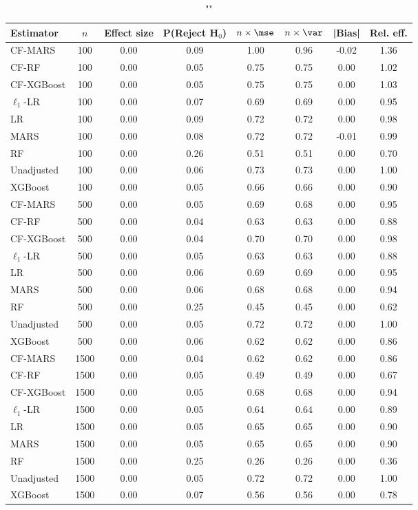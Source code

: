 \begin{table}
\centering
\caption{""}
\begin{tabular}{lccccccc}
\toprule
Estimator & $n$ & Effect size & P(Reject H$_0$) & $n\times\mse$ & $n\times \var$ & |Bias| & Rel. eff.\\ \midrule
CF-MARS & 100 & 0.00 & 0.09 & 1.00 & 0.96 & -0.02 & 1.36 \\ 
CF-RF & 100 & 0.00 & 0.05 & 0.75 & 0.75 &  0.00 & 1.02 \\ 
CF-XGBoost & 100 & 0.00 & 0.05 & 0.75 & 0.75 &  0.00 & 1.03 \\ 
$\ell_1$-LR & 100 & 0.00 & 0.07 & 0.69 & 0.69 &  0.00 & 0.95 \\ 
LR & 100 & 0.00 & 0.09 & 0.72 & 0.72 &  0.00 & 0.98 \\ 
MARS & 100 & 0.00 & 0.08 & 0.72 & 0.72 & -0.01 & 0.99 \\ 
RF & 100 & 0.00 & 0.26 & 0.51 & 0.51 &  0.00 & 0.70 \\ 
Unadjusted & 100 & 0.00 & 0.06 & 0.73 & 0.73 &  0.00 & 1.00 \\ 
XGBoost & 100 & 0.00 & 0.05 & 0.66 & 0.66 &  0.00 & 0.90 \\ \addlinespace 
CF-MARS & 500 & 0.00 & 0.05 & 0.69 & 0.68 &  0.00 & 0.95 \\ 
CF-RF & 500 & 0.00 & 0.04 & 0.63 & 0.63 &  0.00 & 0.88 \\ 
CF-XGBoost & 500 & 0.00 & 0.04 & 0.70 & 0.70 &  0.00 & 0.98 \\ 
$\ell_1$-LR & 500 & 0.00 & 0.05 & 0.63 & 0.63 &  0.00 & 0.88 \\ 
LR & 500 & 0.00 & 0.06 & 0.69 & 0.69 &  0.00 & 0.95 \\ 
MARS & 500 & 0.00 & 0.06 & 0.68 & 0.68 &  0.00 & 0.94 \\ 
RF & 500 & 0.00 & 0.25 & 0.45 & 0.45 &  0.00 & 0.62 \\ 
Unadjusted & 500 & 0.00 & 0.05 & 0.72 & 0.72 &  0.00 & 1.00 \\ 
XGBoost & 500 & 0.00 & 0.06 & 0.62 & 0.62 &  0.00 & 0.86 \\ \addlinespace 
CF-MARS & 1500 & 0.00 & 0.04 & 0.62 & 0.62 &  0.00 & 0.86 \\ 
CF-RF & 1500 & 0.00 & 0.05 & 0.49 & 0.49 &  0.00 & 0.67 \\ 
CF-XGBoost & 1500 & 0.00 & 0.05 & 0.68 & 0.68 &  0.00 & 0.94 \\ 
$\ell_1$-LR & 1500 & 0.00 & 0.05 & 0.64 & 0.64 &  0.00 & 0.89 \\ 
LR & 1500 & 0.00 & 0.05 & 0.65 & 0.65 &  0.00 & 0.90 \\ 
MARS & 1500 & 0.00 & 0.05 & 0.65 & 0.65 &  0.00 & 0.90 \\ 
RF & 1500 & 0.00 & 0.25 & 0.26 & 0.26 &  0.00 & 0.36 \\ 
Unadjusted & 1500 & 0.00 & 0.05 & 0.72 & 0.72 &  0.00 & 1.00 \\ 
XGBoost & 1500 & 0.00 & 0.07 & 0.56 & 0.56 &  0.00 & 0.78 \\
\bottomrule
\end{tabular}
\end{table}

